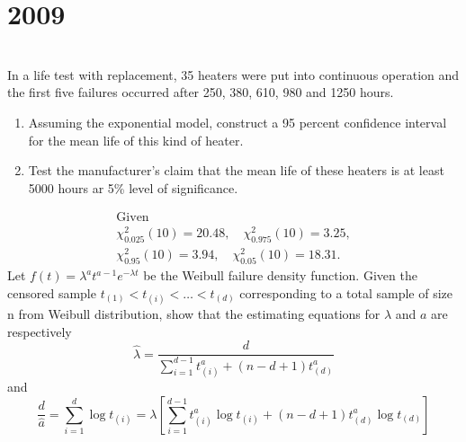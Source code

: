 \section*{2009}
\vspace{-.5cm}
\hrulefill \smallskip\\
 In a life test with replacement, 35 heaters were put into continuous operation and the first five failures occurred after 250, 380, 610, 980 and 1250 hours.
\begin{enumerate}[topsep=0pt, itemsep = -1ex,label=(\roman*)]
    \item Assuming the exponential model, construct a 95 percent confidence interval for the mean life of this kind of heater.
    \item Test the manufacturer's claim that the mean life of these heaters is at least 5000 hours ar 5\% level of significance.
\end{enumerate} 
\begin{gather*}
    \text{Given} \\
    \chi^2_{0.025}(10) = 20.48, \quad \chi^2_{0.975}(10) = 3.25,\\
    \chi^2_{0.95}(10) = 3.94, \quad \chi^2_{0.05}(10) = 18.31.
\end{gather*}
 Let $f(t) = \lambda^at^{a-1}e^{-\lambda t}$ be the Weibull failure density function. Given the censored sample $t_{(1)}<t_{(i)}<\ldots<t_{(d)}$ corresponding to a total sample of size n from Weibull distribution, show that the estimating equations for $\lambda$ and $a$ are respectively
\[ \hat{\lambda} = \dfrac{d}{\sum_{i=1}^{d-1}t^a_{(i)} + (n - d + 1) t^a_{(d)}} \] and 
\[ \frac{d}{\hat{a}} = \sum_{i=1}^{d}\log t_{(i)} =  \lambda\left[ \sum_{i=1}^{d-1}t^a_{(i)}\log t_{(i)} + (n - d + 1) t^a_{(d)}\log t_{(d)} \right]\]

